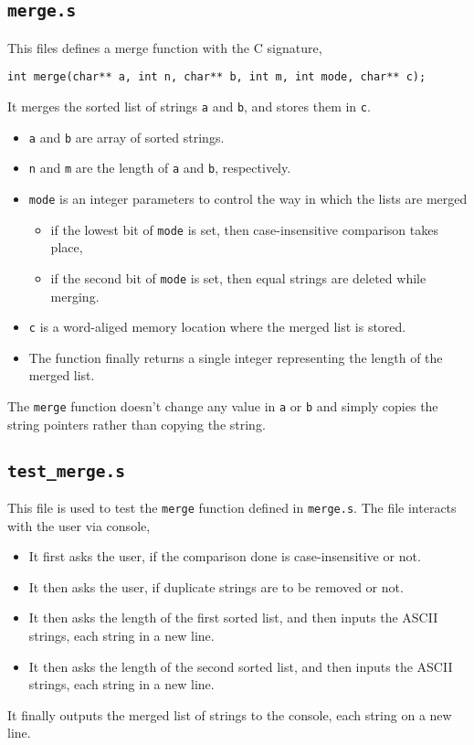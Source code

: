 \documentclass[a4paper]{scrartcl}
\theoremstyle{definition}
\renewcommand{\tt}{\texttt}
\newcommand{\fun}{\texttt}
\begin{document}
\subsection*{\tt{merge.s}}
This files defines a merge function with the C signature,
\begin{verbatim}
int merge(char** a, int n, char** b, int m, int mode, char** c);
\end{verbatim}
It merges the sorted list of strings \tt{a} and \tt{b}, and stores them in \tt{c}.
\begin{itemize}
	\item \tt{a} and \tt{b} are array of sorted strings.
	\item \tt{n} and \tt{m} are the length of \tt{a} and \tt{b}, respectively.
	\item \tt{mode} is an integer parameters to control the way in which the lists are merged
		\begin{itemize}
			\item if the lowest bit of \tt{mode} is set, then case-insensitive comparison takes place,
			\item if the second bit of \tt{mode} is set, then equal strings are deleted while merging.
		\end{itemize}
	\item \tt{c} is a word-aliged memory location where the merged list is stored.
	\item The function finally returns a single integer representing the length of the merged list.
\end{itemize}
The \fun{merge} function doesn't change any value in \tt{a} or \tt{b} and simply copies the string pointers rather than copying the string.

\subsection*{\tt{test_merge.s}}
This file is used to test the \fun{merge} function defined in \tt{merge.s}. The file interacts with the user via console,
\begin{itemize}
	\item It first asks the user, if the comparison done is case-insensitive or not.
	\item It then asks the user, if duplicate strings are to be removed or not.
	\item It then asks the length of the first sorted list, and then inputs the ASCII strings, each string in a new line.
	\item It then asks the length of the second sorted list, and then inputs the ASCII strings, each string in a new line.
\end{itemize}
It finally outputs the merged list of strings to the console, each string on a new line.
\end{document}
